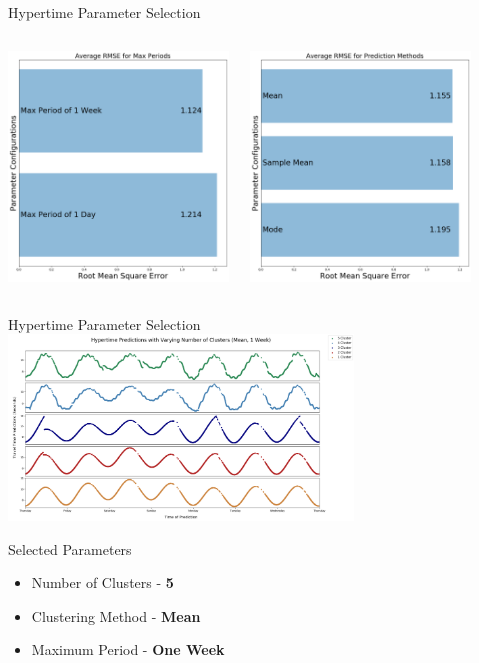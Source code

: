 \documentclass{beamer}
\begin{document}
\begin{frame}[t]{Hypertime Parameter Selection}

  \begin{columns}[t]
    {\includegraphics[width=2.3in]{images/Average_RMSE_for_Max_Periods.png}}

    {\includegraphics[width=2.3in]{images/Average_RMSE_for_Prediction_Methods.png}}
  \end{columns}

\end{frame}



\begin{frame}[t]{Hypertime Parameter Selection}
    \centering
    \vspace*{-0.25cm}
    {\includegraphics[width = 3.6in]{images/varying_clusters.png}}
    \vspace*{-0.45cm}

  \begin{block}{Selected Parameters}
    \begin{itemize}
      \item Number of Clusters - \textbf{5}
      \item Clustering Method - \textbf{Mean}
      \item Maximum Period - \textbf{One Week}
    \end{itemize}
  \end{block}

\end{frame}
\end{document}
